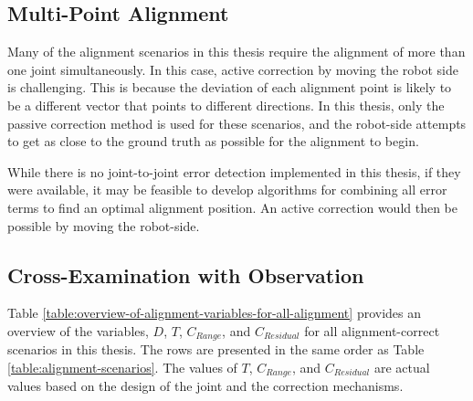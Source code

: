 \subsection{Multi-Point Alignment}
\label{subsection:new-hypo-multi-point-alignment}

Many of the alignment scenarios in this thesis require the alignment of more than one joint simultaneously. In this case, active correction by moving the robot side is challenging. This is because the deviation of each alignment point is likely to be a different vector that points to different directions. In this thesis, only the passive correction method is used for these scenarios, and the robot-side attempts to get as close to the ground truth as possible for the alignment to begin. 

While there is no joint-to-joint error detection implemented in this thesis, if they were available, it may be feasible to develop algorithms for combining all error terms to find an optimal alignment position. An active correction would then be possible by moving the robot-side.

\subsection{Cross-Examination with Observation}
\label{subsection:new-hypo-cross-examination-with-observation}

Table \ref{table:overview-of-alignment-variables-for-all-alignment} provides an overview of the variables, $D$, $T$, $C_{Range}$, and $C_{Residual}$ for all alignment-correct scenarios in this thesis. The rows are presented in the same order as Table \ref{table:alignment-scenarios}. The values of $T$, $C_{Range}$, and $C_{Residual}$ are actual values based on the design of the joint and the correction mechanisms. 

